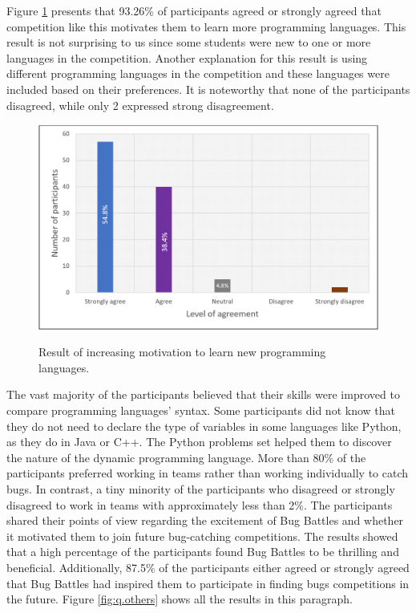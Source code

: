 \documentclass{article}
\begin{document}
Figure \ref{fig:q.b} presents that 93.26\% of participants agreed or strongly agreed that competition like this motivates them to learn more programming languages. This result is not surprising to us since some students were new to one or more languages in the competition. Another explanation for this result is using different programming languages in the competition and these languages were included based on their preferences. It is noteworthy that none of the participants disagreed, while only 2 expressed strong disagreement. 
\begin{figure}[!h]
{\includegraphics[width=\textwidth]{241_3.png}}
\caption{Result of increasing motivation to learn new programming languages.} \label{fig:q.b}
\end{figure}

The vast majority of the participants believed that their skills were improved to compare programming languages' syntax. Some participants did not know that they do not need to declare the type of variables in some languages like Python, as they do in Java or C++. The Python problems set helped them to discover the nature of the dynamic programming language.  More than 80\% of the participants preferred working in teams rather than working individually to catch bugs.  In contrast, a tiny minority of the participants who disagreed or strongly disagreed to work in teams with approximately less than 2\%. The participants shared their points of view regarding the excitement of Bug Battles and whether it motivated them to join future bug-catching competitions. The results showed that a high percentage of the participants found Bug Battles to be thrilling and beneficial. Additionally, 87.5\% of the participants either agreed or strongly agreed that Bug Battles had inspired them to participate in finding bugs competitions in the future. Figure \ref{fig:q.others} shows all the results in this paragraph.  
\end{document}
